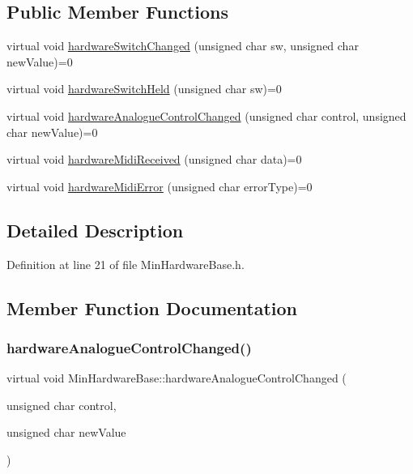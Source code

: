 \subsection*{Public Member Functions}
\begin{DoxyCompactItemize}
\item 
virtual void \hyperlink{class_min_hardware_base_a782fcaa265c084be39b509bd289dc42f}{hardware\+Switch\+Changed} (unsigned char sw, unsigned char new\+Value)=0
\item 
virtual void \hyperlink{class_min_hardware_base_a9e05f7b18377441b61457ded9a57f088}{hardware\+Switch\+Held} (unsigned char sw)=0
\item 
virtual void \hyperlink{class_min_hardware_base_a68f71adaa4f8ed5d170fa09820f63871}{hardware\+Analogue\+Control\+Changed} (unsigned char control, unsigned char new\+Value)=0
\item 
virtual void \hyperlink{class_min_hardware_base_a8dc8c84b39b7b80d4a3c7e7fce017f2a}{hardware\+Midi\+Received} (unsigned char data)=0
\item 
virtual void \hyperlink{class_min_hardware_base_ab65fc29881bb7dea6273c0753ad5d7dd}{hardware\+Midi\+Error} (unsigned char error\+Type)=0
\end{DoxyCompactItemize}


\subsection{Detailed Description}


Definition at line 21 of file Min\+Hardware\+Base.\+h.



\subsection{Member Function Documentation}
\mbox{\label{class_min_hardware_base_a68f71adaa4f8ed5d170fa09820f63871}} 
\subsubsection{\texorpdfstring{hardware\+Analogue\+Control\+Changed()}{hardwareAnalogueControlChanged()}}
{\footnotesize\ttfamily virtual void Min\+Hardware\+Base\+::hardware\+Analogue\+Control\+Changed (\begin{DoxyParamCaption}\item[{unsigned char}]{control,  }\item[{unsigned char}]{new\+Value }\end{DoxyParamCaption})\hspace{0.3cm}{\ttfamily [pure virtual]}}



